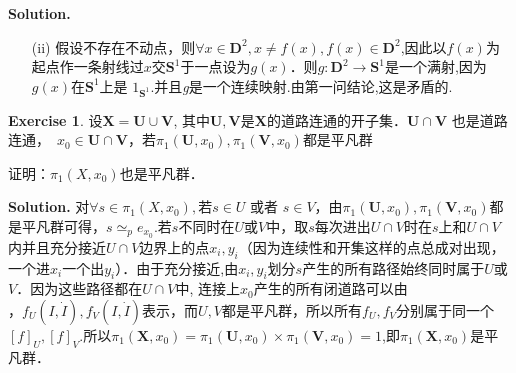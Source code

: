 \documentclass[a4paper]{book}
\newenvironment{solution}%
{\noindent\textbf{Solution.}}%
{\qedhere}
\numberwithin{equation}{chapter}
\theoremstyle{definition}
\newtheorem{exc}[exm]{Exercise}
\begin{document}
\begin{multicols}{2}
\begin{solution}
\begin{itemize}
		
		\item [(ii)] 假设不存在不动点，则$ \forall x \in \mathbf{D}^2, x \neq f(x), f(x) \in  \mathbf{D}^2$,因此以$ f(x) $为起点作一条射线过$ x $交$ \mathbf{S}^1 $于一点设为$ g(x) $．则$ g: \mathbf{D}^2 \rightarrow \mathbf{S}^1 $是一个满射,因为$ g(x) $在$ \mathbf{S}^1 $上是 $1_{\mathbf{S}^1}$.并且\textit{g}是一个连续映射.由第一问结论,这是矛盾的.
	\end{itemize}
\end{solution}

\begin{exc}
	设$ \mathbf{X} = \mathbf{U} \cup \mathbf{V} $, 其中$ \mathbf{U}, \mathbf{V} $是$ \mathbf{X} $的道路连通的开子集．$ \mathbf{U} \cap \mathbf{V} $ 也是道路连通，　$ x_0 \in  \mathbf{U} \cap \mathbf{V} $，若$ \pi_1(\mathbf{U}, x_0), \pi_1(\mathbf{V}, x_0) $都是平凡群
	
	证明：$ \pi_1(X, x_0) $也是平凡群．
\end{exc}

\begin{solution}
	对$ \forall s \in \pi_1(X, x_0), $若$ s \in U \text{ 或者 } s \in V $，由$ \pi_1(\mathbf{U}, x_0), \pi_1(\mathbf{V}, x_0) $都是平凡群可得，$ s \simeq_p e_{x_0} $.若$ s $不同时在$ U $或$ V $中，取$ s $每次进出$ U \cap V $时在$ s $上和$ U \cap V $内并且充分接近$ U \cap V $边界上的点$ x_i, y_i $（因为连续性和开集这样的点总成对出现，一个进$ x_i $一个出$ y_i $）．由于充分接近,由$ x_i,y_i $划分$ s $产生的所有路径始终同时属于$ U $或$ V $．因为这些路径都在$U \cap V$中, 连接上$ x_0 $产生的所有闭道路可以由$ ，f_U(I,\dot{I}),f_V(I,\dot{I}) $表示，而$ U,V $都是平凡群，所以所有$ f_U,f_V $分别属于同一个$ [f]_U,[f]_V $.所以$\pi_1(\mathbf{X}, x_0) = \pi_1(\mathbf{U}, x_0) \times \pi_1(\mathbf{V}, x_0) = {1}$,即$ \pi_1(\mathbf{X}, x_0) $是平凡群．
\end{solution}


\end{multicols}
\end{document}
